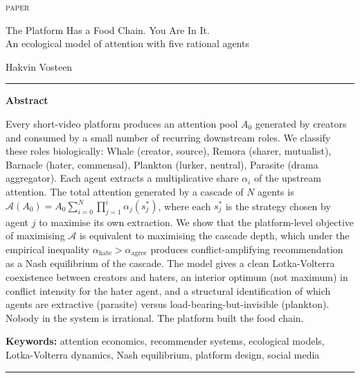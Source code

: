 \documentclass[12pt,a4paper]{article}
\begin{document}
{\small\scshape paper}

\vspace{0.8cm}

{\LARGE The Platform Has a Food Chain. You Are In It.\\[6pt]
\normalsize An ecological model of attention with five rational agents}

\vspace{0.7cm}

Hakvin Vosteen

\vspace{0.6cm}

\noindent\rule{\textwidth}{0.4pt}

\textbf{Abstract}

\vspace{0.2em}

Every short-video platform produces an attention pool $A_0$ generated by creators and consumed by a small number of recurring downstream roles. We classify these roles biologically: Whale (creator, source), Remora (sharer, mutualist), Barnacle (hater, commensal), Plankton (lurker, neutral), Parasite (drama aggregator). Each agent extracts a multiplicative share $\alpha_i$ of the upstream attention. The total attention generated by a cascade of $N$ agents is $\mathcal{A}(A_0) = A_0 \sum_{i=0}^{N} \prod_{j=1}^{i} \alpha_j(s_j^{*})$, where each $s_j^{*}$ is the strategy chosen by agent $j$ to maximise its own extraction. We show that the platform-level objective of maximising $\mathcal{A}$ is equivalent to maximising the cascade depth, which under the empirical inequality $\alpha_{\mathrm{hate}} > \alpha_{\mathrm{agree}}$ produces conflict-amplifying recommendation as a Nash equilibrium of the cascade. The model gives a clean Lotka-Volterra coexistence between creators and haters, an interior optimum (not maximum) in conflict intensity for the hater agent, and a structural identification of which agents are extractive (parasite) versus load-bearing-but-invisible (plankton). Nobody in the system is irrational. The platform built the food chain.

\vspace{0.4em}

{\small\textbf{Keywords:} attention economics, recommender systems, ecological models, Lotka-Volterra dynamics, Nash equilibrium, platform design, social media}

\noindent\rule{\textwidth}{0.4pt}

\vspace{0.5cm}
\end{document}
